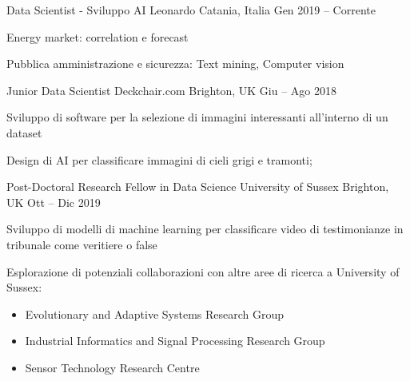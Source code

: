 
  \begin{cventries}
    \cventry
    {Data Scientist - Sviluppo AI}
    {Leonardo}    
    {Catania, Italia}
    {Gen 2019 -- Corrente}
    {
      \begin{cvitems}
        \item {Energy market: correlation e forecast}
        \item {Pubblica amministrazione e sicurezza: Text mining, Computer vision}
      \end{cvitems}
    }

    \cventry
    {Junior Data Scientist}
    {Deckchair.com}
    {Brighton, UK}
    {Giu -- Ago 2018}
    {
      \begin{cvitems}
        \item Sviluppo di software per la selezione di immagini interessanti all'interno di un dataset
        \item Design di AI per classificare immagini di cieli grigi e tramonti;
      \end{cvitems}
    }
  \end{cventries}

  \begin{cventries}
    \cventry
    {Post-Doctoral Research Fellow in Data Science}
    {University of Sussex}
    {Brighton, UK}
    {Ott -- Dic 2019}
    {
      \begin{cvitems}
        \item Sviluppo di modelli di machine learning per classificare video di testimonianze in tribunale come veritiere o false
        \item Esplorazione di potenziali collaborazioni con altre aree di ricerca a University of Sussex: 
        \begin{itemize}
          \item Evolutionary and Adaptive Systems Research Group
          \item Industrial Informatics and Signal Processing Research Group
          \item Sensor Technology Research Centre
        \end{itemize}
      \end{cvitems}
    }
  \end{cventries}

